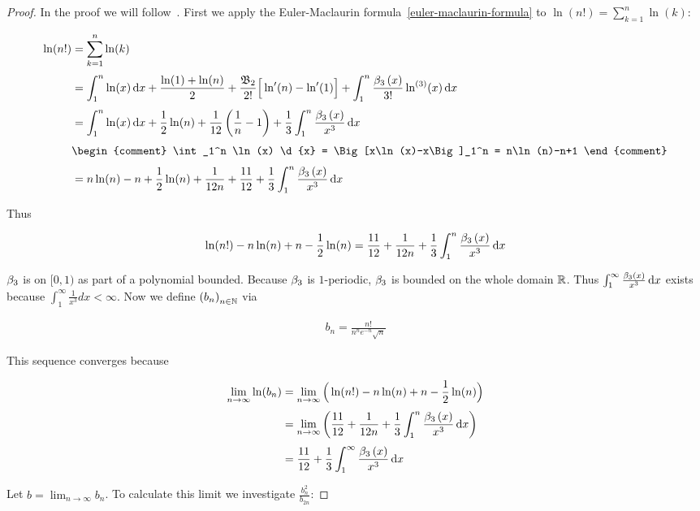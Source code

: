 \begin{proof}
  In the proof we will follow~\cite[pp. 227-228]{koenigsberger}. First we apply the Euler-Maclaurin formula~\eqref{euler-maclaurin-formula} to $\ln(n!)=\sum_{k=1}^n \ln(k)$:

  \begin{align}
    \ln(n!) & = \sum_{k=1}^n \ln(k) \nl
    & = \int_1^n \ln(x) \d{x} + \frac{\ln(1)+\ln(n)}{2} + \frac{\bn[2]}{2!} \Big[\ln'(n)-\ln'(1)\Big] + \int_1^n \frac{\bp[3]{x}}{3!} \ln^{(3)}(x) \d{x} \nl
    &= \int_1^n \ln(x) \d{x} + \frac 12 \ln(n) + \frac{1}{12} \left(\frac 1n - 1\right) + \frac 13 \int_1^n \frac{\bp[3]{x}}{x^3} \d{x} \nl
    & \begin{comment}
      \int_1^n \ln(x) \d{x} = \Big[x\ln(x)-x\Big]_1^n = n\ln(n)-n+1
    \end{comment} \nonumber \nl
    &= n\ln(n)-n+\frac 12 \ln(n) + \frac{1}{12n} + \frac{11}{12} + \frac{1}{3} \int_1^n \frac{\bp[3]{x}}{x^3}\d{x} 
  \end{align}

  \noindent Thus

  \begin{align}
    \ln(n!) - n\ln(n) + n - \frac 12 \ln(n) = \frac{11}{12} + \frac{1}{12n} + \frac 13 \int_1^n \frac{\bp[3]{x}}{x^3} \d{x}
  \end{align}

  $\bps[3]$ is on $[0,1)$ as part of a polynomial bounded. Because $\bps[3]$ is $1$-periodic, $\bps[3]$ is bounded on the whole domain $\R$. Thus $\int_1^\infty \frac{\bp[3]{x}}{x^3} \d{x}$ exists because $\int_1^\infty \frac 1{x^3} d{x} < \infty$. Now we define $\seq{b_n}$ via

  \begin{align}
    b_n = \frac{n!}{n^n e^{-n} \sqrt{n}}
  \end{align}

  \noindent This sequence converges because

  \begin{align}
    \lim_{n\to\infty} \ln(b_n) & = \lim_{n\to\infty} \Big( \ln(n!) -n \ln(n) + n - \frac 12\ln(n) \Big) \nl
    & = \lim_{n\to\infty} \left( \frac{11}{12} + \frac{1}{12n} + \frac 13\int_1^n \frac{\bp[3]{x}}{x^3} \d{x}\right) \nl
    & = \frac{11}{12} + \frac 13\int_1^{\infty} \frac{\bp[3]{x}}{x^3} \d{x}
  \end{align}

  \noindent Let $b=\lim_{n\to\infty} b_n$. To calculate this limit we investigate $\tfrac{b_n^2}{b_{2n}}$:


\end{proof}
